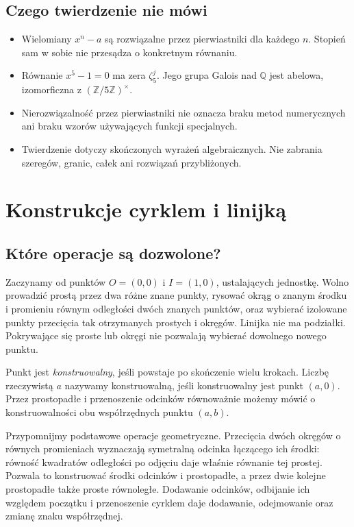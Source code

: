 \documentclass[11pt,a4paper,oneside]{book}
\numberwithin{equation}{section}
\theoremstyle{plain}
\theoremstyle{definition}
\theoremstyle{remark}
\newcommand{\Q}{\mathbb{Q}}
\newcommand{\Z}{\mathbb{Z}}
\begin{document}
\section{Czego twierdzenie nie mówi}
\begin{itemize}
\item Wielomiany $x^n-a$ są rozwiązalne przez pierwiastniki dla każdego $n$. Stopień sam w sobie nie przesądza o konkretnym równaniu.
\item Równanie $x^5-1=0$ ma zera $\zeta_5^j$. Jego grupa Galois nad $\Q$ jest abelowa, izomorficzna z $(\Z/5\Z)^\times$.
\item Nierozwiązalność przez pierwiastniki nie oznacza braku metod numerycznych ani braku wzorów używających funkcji specjalnych.
\item Twierdzenie dotyczy skończonych wyrażeń algebraicznych. Nie zabrania szeregów, granic, całek ani rozwiązań przybliżonych.
\end{itemize}


\chapter{Konstrukcje cyrklem i linijką}

\section{Które operacje są dozwolone?}

Zaczynamy od punktów $O=(0,0)$ i $I=(1,0)$, ustalających jednostkę. Wolno prowadzić prostą przez dwa różne znane punkty, rysować okrąg o znanym środku i promieniu równym odległości dwóch znanych punktów, oraz wybierać izolowane punkty przecięcia tak otrzymanych prostych i okręgów. Linijka nie ma podziałki. Pokrywające się proste lub okręgi nie pozwalają wybierać dowolnego nowego punktu.

Punkt jest \emph{konstruowalny}, jeśli powstaje po skończenie wielu krokach. Liczbę rzeczywistą $a$ nazywamy konstruowalną, jeśli konstruowalny jest punkt $(a,0)$. Przez prostopadłe i przenoszenie odcinków równoważnie możemy mówić o konstruowalności obu współrzędnych punktu $(a,b)$.

Przypomnijmy podstawowe operacje geometryczne. Przecięcia dwóch okręgów o równych promieniach wyznaczają symetralną odcinka łączącego ich środki: równość kwadratów odległości po odjęciu daje właśnie równanie tej prostej. Pozwala to konstruować środki odcinków i prostopadłe, a przez dwie kolejne prostopadłe także proste równoległe. Dodawanie odcinków, odbijanie ich względem początku i przenoszenie cyrklem daje dodawanie, odejmowanie oraz zmianę znaku współrzędnej.
\end{document}
